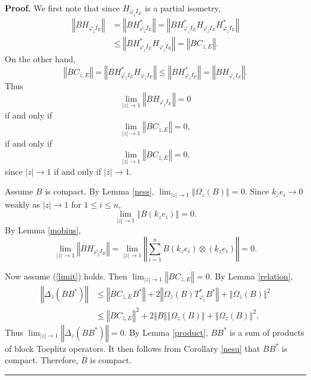 \documentclass{article}%
\newenvironment{proof}[1][Proof]{\noindent\textbf{#1.} }{\ \rule{0.5em}{0.5em}}
\begin{document}
\begin{proof}
We first note that since $H_{\overline{\varphi_{z}}I_{E}}$ is a partial
isometry,%
\begin{align*}
\left\Vert BH_{\overline{\varphi_{\overline{z}}}I_{E}}\right\Vert  &
=\left\Vert BH_{\overline{\varphi_{z}}I_{E}}^{\ast}\right\Vert =\left\Vert
BH_{\overline{\varphi_{z}}I_{E}}^{\ast}H_{\overline{\varphi_{z}}I_{E}%
}H_{\overline{\varphi_{z}}I_{E}}^{\ast}\right\Vert \\
&  \leq\left\Vert BH_{\overline{\varphi_{z}}I_{E}}^{\ast}H_{\overline
{\varphi_{z}}I_{E}}\right\Vert =\left\Vert BC_{z,E}\right\Vert .
\end{align*}
On the other hand,
\[
\left\Vert BC_{z,E}\right\Vert =\left\Vert BH_{\overline{\varphi_{z}}I_{E}%
}^{\ast}H_{\overline{\varphi_{z}}I_{E}}\right\Vert \leq\left\Vert
BH_{\overline{\varphi_{z}}I_{E}}^{\ast}\right\Vert =\left\Vert BH_{\overline
{\varphi_{\overline{z}}}I_{E}}\right\Vert .
\]
Thus%
\[
\lim_{\left\vert z\right\vert \rightarrow1}\left\Vert BH_{\overline
{\varphi_{\overline{z}}}I_{E}}\right\Vert =0
\]
if and only if
\[
\lim_{\left\vert z\right\vert \rightarrow1}\left\Vert BC_{z,E}\right\Vert =0,
\]
if and only if%
\[
\lim_{\left\vert z\right\vert \rightarrow1}\left\Vert BC_{\overline{z}%
,E}\right\Vert =0,
\]
since $\left\vert z\right\vert \rightarrow1$ if and only if $\left\vert
\overline{z}\right\vert \rightarrow1.$

Assume $B$ is compact. By Lemma \ref{ness}, $\lim_{\left\vert z\right\vert
\rightarrow1}\left\Vert \Omega_{z}(B)\right\Vert =0$. Since $k_{z}%
e_{i}\rightarrow0$ weakly as $\left\vert z\right\vert \rightarrow1$ for $1\leq
i\leq n,$
\[
\lim_{\left\vert z\right\vert \rightarrow1}\left\Vert B\left(  k_{z}%
e_{i}\right)  \right\Vert =0.
\]
By Lemma \ref{mobius},%
\[
\lim_{\left\vert z\right\vert \rightarrow1}\left\Vert BH_{\overline
{\varphi_{\overline{z}}}I_{E}}\right\Vert =\lim_{\left\vert z\right\vert
\rightarrow1}\left\Vert \sum_{i=1}^{n}B\left(  k_{z}e_{i}\right)
\otimes\left(  k_{z}e_{i}\right)  \right\Vert =0.
\]


Now assume (\ref{limit}) holds. Then $\lim_{\left\vert z\right\vert
\rightarrow1}\left\Vert BC_{\overline{z},E}\right\Vert =0.$ By Lemma
\ref{relation},
\begin{align*}
\left\Vert \Delta_{z}(BB^{\ast})\right\Vert  &  \leq\left\Vert BC_{\overline
{z},E}B^{\ast}\right\Vert +2\left\Vert \Omega_{\overline{z}}(B)T_{\varphi
_{\overline{z}}}^{\ast}B^{\ast}\right\Vert +\left\Vert \Omega_{\overline{z}%
}(B)\right\Vert ^{2}\\
&  \leq\left\Vert BC_{\overline{z},E}\right\Vert ^{2}+2\left\Vert B\right\Vert
\left\Vert \Omega_{\overline{z}}(B)\right\Vert +\left\Vert \Omega
_{\overline{z}}(B)\right\Vert ^{2}.
\end{align*}
Thus $\lim_{\left\vert z\right\vert \rightarrow1}\left\Vert \Delta
_{z}(BB^{\ast})\right\Vert =0.$ By Lemma \ref{product}, $BB^{\ast}$ is a sum
of products of block Toeplitz operators. It then follows from Corollary
\ref{nesu} that $BB^{\ast}$ is compact. Therefore, $B$ is compact.
\end{proof}
\end{document}
